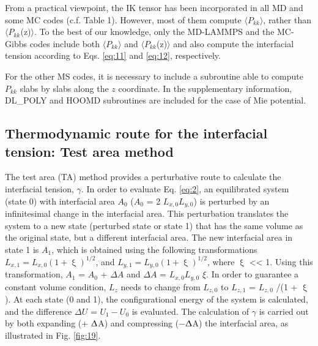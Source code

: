 \documentclass[9pt,tutorial]{livecoms}
\begin{document}
From a practical viewpoint, the IK tensor has been incorporated in all MD and
some MC codes (c.f. Table 1). However, most of them compute
${\langle}P_{kk}{\rangle}$, rather than
${\langle}P_{kk}$(z)${\rangle}$. To the best of our knowledge, only
the MD-LAMMPS and the MC-Gibbs codes include both
${\langle}P_{kk}{\rangle}$ and
${\langle}P_{kk}$(z)${\rangle}$ and also compute the interfacial
tension according to Eqs. \ref{eq:11} and \ref{eq:12}, respectively.

For the other MS codes, it is necessary to include a subroutine able to compute
$P_{kk}$ slabs by slabs along the $z$ coordinate. In the
supplementary information, DL\_POLY and HOOMD subroutines are included for the case of Mie
potential. 

\subsection{Thermodynamic route for the interfacial tension: Test area method}

The test area (TA) method provides a perturbative route to calculate the
interfacial tension, {${\gamma}$}. In order to evaluate Eq. \ref{eq:2}, an
equilibrated system (state 0) with interfacial area $A_{0}$
($A_{0}$ = 2 $L_{x,0}L_{y,0}$) is perturbed by an
infinitesimal change in the interfacial area. This perturbation translates the
system to a new state (perturbed state or state 1) that has the same volume as
the original state, but a different interfacial area. The new interfacial area
in state 1 is $A_{1}$, which is obtained using the following
transformations $L_{x,1} = L_{x,0} (1 + \upxi)^{1/2}$, and 
$L_{y,1} = L_{y,0} (1 + \upxi)^{1/2}$, where
{${\upxi}$} {\textless}{\textless} 1. Using this transformation,
$A_{1}$ = $A_{0}$ + {${\Delta}$}$A$ and
{${\Delta}$}$A$ = $L_{x,0}L_{y,0}$ {${\xi}$}. In
order to guarantee a constant volume condition, $L_{z}$ needs to
change from $L_{z,0}$ to $L_{z,1}$ = $L_{z,0}$ /(1
+ {${\upxi}$}). At each state (0 and 1), the configurational energy of the
system is calculated, and the difference {${\Delta}$}$U$
= $U_{1}{-}U_{0}$ is evaluated. The calculation of
{${\gamma}$} is carried out by both expanding (+ {${\Updelta}$}A) and
compressing (${-}${${\Updelta}$}A) the interfacial area, as illustrated
in Fig. \ref{fig:19}.
\end{document}
